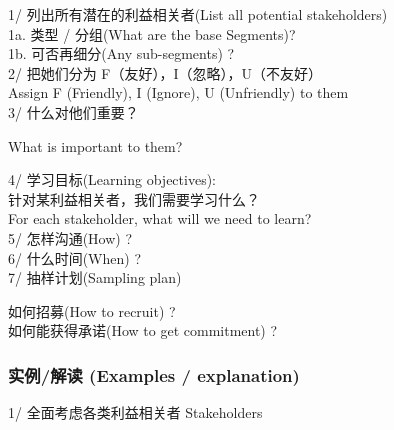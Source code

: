 1/ 列出所有潜在的利益相关者(List all potential stakeholders)\\
1a. 类型 / 分组(What are the base Segments)?\\
1b. 可否再细分(Any sub-segments) ?\\
2/ 把她们分为 F（友好），I（忽略），U（不友好）\\
Assign F (Friendly), I (Ignore), U (Unfriendly) to them\\
3/ 什么对他们重要？

\begin{description}
\tightlist
\item[]
What is important to them?\\
\end{description}

4/ 学习目标(Learning objectives):\\
针对某利益相关者，我们需要学习什么？\\
For each stakeholder, what will we need to learn?\\
5/ 怎样沟通(How) ?\\
6/ 什么时间(When) ?\\
7/ 抽样计划(Sampling plan)

\begin{description}
\tightlist
\item[]
如何招募(How to recruit) ?\\

如何能获得承诺(How to get commitment) ?\\
\end{description}

\begin{description}
\item[]
\end{description}

\hypertarget{ux5b9eux4f8bux89e3ux8bfb-examples-explanation}{%
\subsubsection{\texorpdfstring{\textbf{实例/解读 (Examples /
explanation)}}{实例/解读 (Examples / explanation)}}\label{ux5b9eux4f8bux89e3ux8bfb-examples-explanation}}

1/ 全面考虑各类利益相关者 Stakeholders\\

